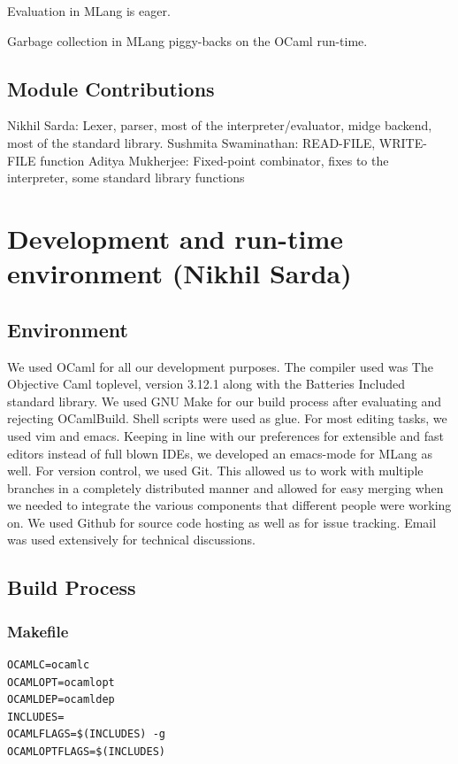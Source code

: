 \documentclass[letterpaper,11pt]{article}
\begin{document}
{Evaluation in MLang is eager.

Garbage collection in MLang piggy-backs on the OCaml run-time.

\subsection{Module Contributions}
Nikhil Sarda: Lexer, parser, most of the interpreter/evaluator, midge backend, most of the standard library.
Sushmita Swaminathan: READ-FILE, WRITE-FILE function
Aditya Mukherjee: Fixed-point combinator, fixes to the interpreter, some standard library functions


\section{Development and run-time environment (Nikhil Sarda)}

\subsection{Environment}


We used OCaml for all our development purposes. The compiler used was The Objective Caml toplevel, version 3.12.1 along with the Batteries Included
standard library. We used GNU Make for our build process after evaluating and rejecting OCamlBuild. Shell scripts were used as glue.
For most editing tasks, we used vim and emacs. Keeping in line with our preferences for extensible and fast editors instead of full
blown IDEs, we developed an emacs-mode for MLang as well. For version control, we used Git. This allowed us to work with multiple branches in a
completely distributed manner and allowed for easy merging when we needed to integrate the various components that different people were working on.
We used Github for source code hosting as well as for issue tracking. Email was used extensively for technical discussions.

\subsection{Build Process}
\lstset{language=bash}
\subsubsection{Makefile}
\begin{lstlisting}
OCAMLC=ocamlc
OCAMLOPT=ocamlopt
OCAMLDEP=ocamldep
INCLUDES=
OCAMLFLAGS=$(INCLUDES) -g
OCAMLOPTFLAGS=$(INCLUDES)


\end{lstlisting}}
\end{document}

